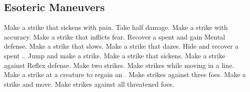 
\small
\subsection{Esoteric Maneuvers}\label{Esoteric Maneuvers}
\begin{spelllist}
 Make a strike that sickens with pain.
 Take half damage.
 Make a strike with  accuracy.
 Make a strike that inflicts fear.
 Recover a spent  and gain  Mental defense.
 Make a strike that slows.
 Make a strike that dazes.
 Hide and recover a spent ..
 Jump and make a strike.
 Make a strike that sickens.
 Make a strike against Reflex defense.
 Make two strikes.
 Make strikes while moving in a line.
 Make a strike at a creature to regain an .
 Make strikes against three foes.
 Make a strike and move.
 Make strikes against all threatened foes.
\end{spelllist}



\small
